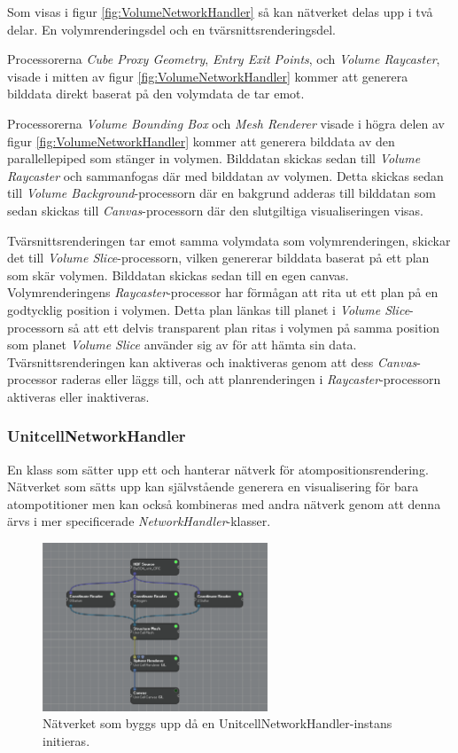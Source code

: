 \documentclass[10pt,oneside,swedish]{article}
\begin{document}
Som visas i figur \ref{fig:VolumeNetworkHandler} så kan nätverket delas upp
i två delar. En volymrenderingsdel och en tvärsnittsrenderingsdel.

Processorerna \emph{Cube Proxy Geometry}, \emph{Entry Exit Points}, och
\emph{Volume Raycaster}, visade i mitten av figur
\ref{fig:VolumeNetworkHandler} kommer att generera bilddata direkt baserat
på den volymdata de tar emot.

Processorerna \emph{Volume Bounding Box} och \emph{Mesh Renderer} visade
i högra delen av figur \ref{fig:VolumeNetworkHandler} kommer att generera
bilddata av den parallellepiped som stänger in volymen. Bilddatan
skickas sedan till \emph{Volume Raycaster} och sammanfogas där med
bilddatan av volymen. Detta skickas sedan till \emph{Volume
Background}-processorn där en bakgrund adderas till bilddatan som sedan
skickas till \emph{Canvas}-processorn där den slutgiltiga
visualiseringen visas.

Tvärsnittsrenderingen tar emot samma volymdata som volymrenderingen,
skickar det till \emph{Volume Slice}-processorn, vilken genererar
bilddata baserat på ett plan som skär volymen. Bilddatan skickas sedan
till en egen canvas. Volymrenderingens \emph{Raycaster}-processor har
förmågan att rita ut ett plan på en godtycklig position i volymen. Detta
plan länkas till planet i \emph{Volume Slice}-processorn så att ett
delvis transparent plan ritas i volymen på samma position som planet
\emph{Volume Slice} använder sig av för att hämta sin data.
Tvärsnittsrenderingen kan aktiveras och inaktiveras genom att dess
\emph{Canvas}-processor raderas eller läggs till, och att
planrenderingen i \emph{Raycaster}-processorn aktiveras eller
inaktiveras.

\subsubsection{UnitcellNetworkHandler}\label{unitcellnetworkhandler}

En klass som sätter upp ett och hanterar nätverk för
atompositionsrendering. Nätverket som sätts upp kan självstående
generera en visualisering för bara atompotitioner men kan också
kombineras med andra nätverk genom att denna ärvs i mer specificerade
\emph{NetworkHandler}-klasser.

\begin{figure}[H]
\centering
\includegraphics[width=0.60000\textwidth]{Images/unitcell_network.png}
\caption{Nätverket som byggs upp då en UnitcellNetworkHandler-instans
initieras.}
\label{fig:UnitcellNetowrkHandler}
\end{figure}
\end{document}
